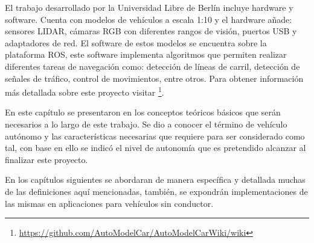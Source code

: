 El trabajo desarrollado por la Universidad Libre de Berlín incluye hardware y software. Cuenta con modelos de vehículos a escala 1:10 y el hardware añade: sensores LIDAR, cámaras RGB con diferentes rangos de visión, puertos USB y adaptadores de red. El software de estos modelos se encuentra sobre la plataforma ROS, este software implementa algoritmos que permiten realizar diferentes tareas de navegación como: detección de líneas de carril, detección de señales de tráfico, control de movimientos, entre otros. Para obtener información más detallada sobre este proyecto visitar \footnote{\url{https://github.com/AutoModelCar/AutoModelCarWiki/wiki}}.







En este capítulo se presentaron en los conceptos teóricos básicos que serán necesarios a lo largo de este trabajo. Se dio a conocer el término de vehículo autónomo y las características necesarias que requiere para ser considerado como tal, con base en ello se indicó el nivel de autonomía que es pretendido alcanzar al finalizar este proyecto.

En los capítulos siguientes se abordaran de manera específica y detallada muchas de las definiciones aquí mencionadas, también, se expondrán implementaciones de las mismas en aplicaciones para vehículos sin conductor.



